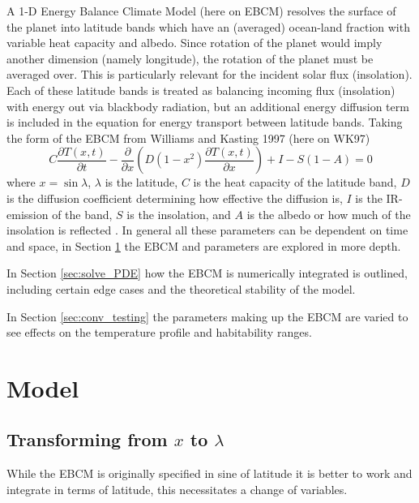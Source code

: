 \documentclass[12pt, onecolumn]{revtex4-2}    %
\begin{document}
A 1-D Energy Balance Climate Model (here on EBCM) resolves the surface of the planet into latitude bands which have an (averaged) ocean-land fraction with variable heat capacity and albedo.
Since rotation of the planet would imply another dimension (namely longitude), the rotation of the planet must be averaged over.
This is particularly relevant for the incident solar flux (insolation).
Each of these latitude bands is treated as balancing incoming flux (insolation) with energy out via blackbody radiation, but an additional energy diffusion term is included in the equation for energy transport between latitude bands.
Taking the form of the EBCM from Williams and Kasting 1997 (here on WK97)
\begin{equation}
    C\frac{\partial T(x, t)}{\partial t} - \frac{\partial}{\partial x} \left(D(1-x^2)\frac{\partial T(x, t)}{\partial x}\right) + I - S(1-A) = 0
    \label{eq:PDE_in_x}
\end{equation}
where $x=\sin\lambda$, $\lambda$ is the latitude, $C$ is the heat capacity of the latitude band,
$D$ is the diffusion coefficient determining how effective the diffusion is, $I$ is the IR-emission of the band,
$S$ is the insolation, and $A$ is the albedo or how much of the insolation is reflected \cite{WK97}.
In general all these parameters can be dependent on time and space, in Section \ref{sec:model} the EBCM and parameters are explored in more depth.

In Section \ref{sec:solve_PDE} how the EBCM is numerically integrated is outlined, including certain edge cases and the theoretical stability of the model.

In Section \ref{sec:conv_testing} the parameters making up the EBCM are varied to see effects on the temperature profile and habitability ranges.

\section{Model} \label{sec:model}

\subsection{Transforming from $x$ to $\lambda$}

While the EBCM is originally specified in sine of latitude it is better to work and integrate in terms of latitude, this necessitates a change of variables.
\end{document}
